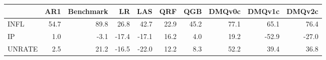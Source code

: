 \begin{tabular}{lrrrrrrrrr}
\toprule
 & AR1 & Benchmark & LR & LAS & QRF & QGB & DMQv0c & DMQv1c & DMQv2c \\
\midrule
INFL & 54.7 & 89.8 & 26.8 & 42.7 & 22.9 & 45.2 & 77.1 & 65.1 & 76.4 \\
IP & 1.0 & -3.1 & -17.4 & -17.1 & 16.2 & 4.0 & 19.2 & -52.9 & -27.0 \\
UNRATE & 2.5 & 21.2 & -16.5 & -22.0 & 12.2 & 8.3 & 52.2 & 39.4 & 36.8 \\
\bottomrule
\end{tabular}
